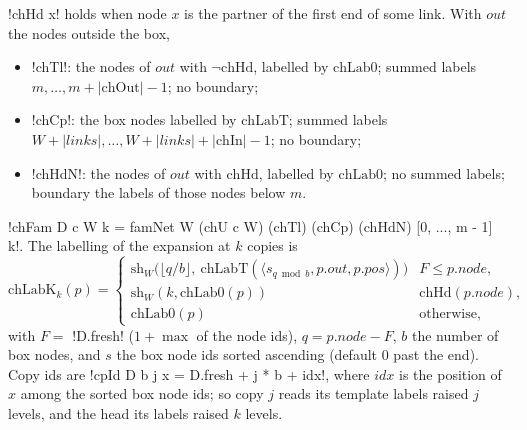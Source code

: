 {\begin{definition}\label{def:boxes-chparts}
\lbx!chHd x! holds when node $x$ is the partner of the first end of some link. With $\mathit{out}$ the nodes outside the box,
\begin{itemize}
\item \lbx!chTl!: the nodes of $\mathit{out}$ with $\lnot\mathrm{chHd}$, labelled by $\mathrm{chLab0}$; summed labels $m,\ldots,m+|\mathrm{chOut}|-1$; no boundary;
\item \lbx!chCp!: the box nodes labelled by $\mathrm{chLabT}$; summed labels $W+|\mathit{links}|,\ldots,W+|\mathit{links}|+|\mathrm{chIn}|-1$; no boundary;
\item \lbx!chHdN!: the nodes of $\mathit{out}$ with $\mathrm{chHd}$, labelled by $\mathrm{chLab0}$; no summed labels; boundary the labels of those nodes below $m$.
\end{itemize}
\lbx!chFam D c W k = famNet W (chU c W) (chTl) (chCp) (chHdN) [0, ..., m - 1] k!. The labelling of the expansion at $k$ copies is
\[
\mathrm{chLabK}_k(p)=\begin{cases}
\mathrm{sh}_W\bigl(\lfloor q/b\rfloor,\ \mathrm{chLabT}(\langle s_{q\bmod b},p.\mathit{out},p.\mathit{pos}\rangle)\bigr) & F\le p.\mathit{node},\\
\mathrm{sh}_W(k,\mathrm{chLab0}(p)) & \mathrm{chHd}(p.\mathit{node}),\\
\mathrm{chLab0}(p) & \text{otherwise},
\end{cases}
\]
with $F=$ \lbx!D.fresh! ($1+\max$ of the node ids), $q=p.\mathit{node}-F$, $b$ the number of box nodes, and $s$ the box node ids sorted ascending (default $0$ past the end). Copy ids are \lbx!cpId D b j x = D.fresh + j * b + idx!, where $\mathit{idx}$ is the position of $x$ among the sorted box node ids; so copy $j$ reads its template labels raised $j$ levels, and the head its labels raised $k$ levels.
\end{definition}

}
